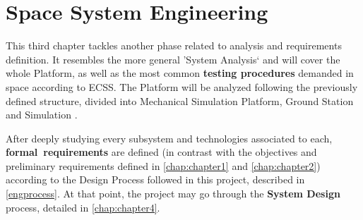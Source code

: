 \chapter{Space System Engineering}\label{chap:chapter3}

This third chapter tackles another phase related to analysis and requirements definition. It resembles the more general 'System Analysis` and will cover the whole Platform, as well as the most common \textbf{testing procedures} demanded in space according to \acrshort{ECSS}. The Platform will be analyzed following the previously defined structure, divided into Mechanical Simulation Platform, Ground Station and Simulation .

After deeply studying every subsystem and technologies associated to each, \textbf{formal~requirements} are defined (in contrast with the objectives and preliminary requirements defined in \autoref{chap:chapter1} and \autoref{chap:chapter2}) according to the Design Process followed in this project, described in \autoref{engprocess}. At that point, the project may go through the \textbf{System Design} process, detailed in \autoref{chap:chapter4}.



